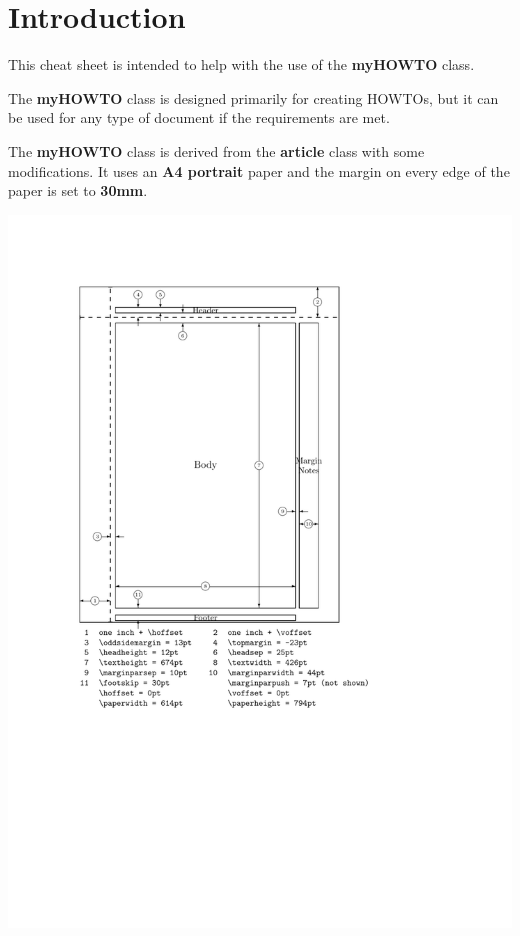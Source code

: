 \section{Introduction}

This cheat sheet is intended to help with the use of the \textbf{myHOWTO} class.

The \textbf{myHOWTO} class is designed primarily for creating HOWTOs, but it can be used for any type of document if the requirements are met. 

The \textbf{myHOWTO} class is derived from the \textbf{article} class with some modifications. It uses an \textbf{A4 portrait} paper and the margin on every edge of the paper is set to \textbf{30mm}.

\qquad
\begin{myFIG}{}
	\includegraphics[page=1,scale=0.3,trim=30mm 100mm 65mm 30mm,clip]{examples/zz_bsp_file_pageLayout.pdf}
\end{myFIG}

